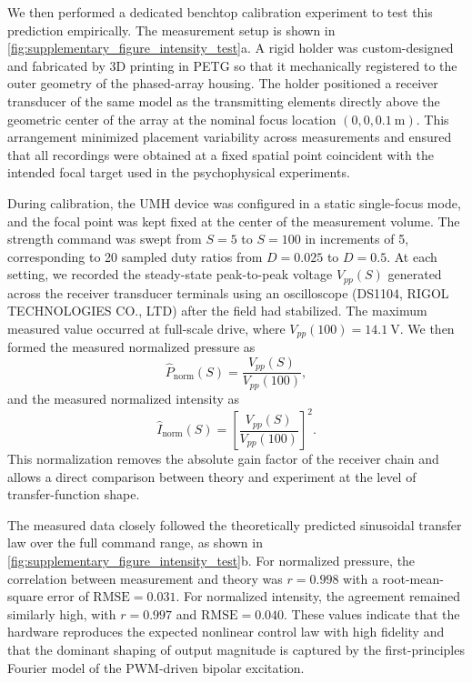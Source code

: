 \documentclass[pdflatex, sn-nature]{sn-jnl}
\theoremstyle{thmstyleone}%
\theoremstyle{thmstyletwo}%
\theoremstyle{thmstylethree}%
\begin{document}
We then performed a dedicated benchtop calibration experiment to test this prediction empirically. The measurement setup is shown in \cref{fig:supplementary_figure_intensity_test}a. A rigid holder was custom-designed and fabricated by 3D printing in PETG so that it mechanically registered to the outer geometry of the phased-array housing. The holder positioned a receiver transducer of the same model as the transmitting elements directly above the geometric center of the array at the nominal focus location $(0,0,\qty{0.1}{\meter})$. This arrangement minimized placement variability across measurements and ensured that all recordings were obtained at a fixed spatial point coincident with the intended focal target used in the psychophysical experiments.

During calibration, the UMH device was configured in a static single-focus mode, and the focal point was kept fixed at the center of the measurement volume. The strength command was swept from $S=5$ to $S=100$ in increments of 5, corresponding to 20 sampled duty ratios from $D=0.025$ to $D=0.5$. At each setting, we recorded the steady-state peak-to-peak voltage $V_{pp}(S)$ generated across the receiver transducer terminals using an oscilloscope (DS1104, RIGOL TECHNOLOGIES CO., LTD) after the field had stabilized. The maximum measured value occurred at full-scale drive, where $V_{pp}(100)=\qty{14.1}{\volt}$. We then formed the measured normalized pressure as
\begin{equation}
    \widehat{P}_{\mathrm{norm}}(S)=\frac{V_{pp}(S)}{V_{pp}(100)},
\end{equation}
and the measured normalized intensity as
\begin{equation}
    \widehat{I}_{\mathrm{norm}}(S)=\left[\frac{V_{pp}(S)}{V_{pp}(100)}\right]^2.
\end{equation}
This normalization removes the absolute gain factor of the receiver chain and allows a direct comparison between theory and experiment at the level of transfer-function shape.

The measured data closely followed the theoretically predicted sinusoidal transfer law over the full command range, as shown in \cref{fig:supplementary_figure_intensity_test}b. For normalized pressure, the correlation between measurement and theory was $r=0.998$ with a root-mean-square error of $\mathrm{RMSE}=0.031$. For normalized intensity, the agreement remained similarly high, with $r=0.997$ and $\mathrm{RMSE}=0.040$. These values indicate that the hardware reproduces the expected nonlinear control law with high fidelity and that the dominant shaping of output magnitude is captured by the first-principles Fourier model of the PWM-driven bipolar excitation.
\end{document}

